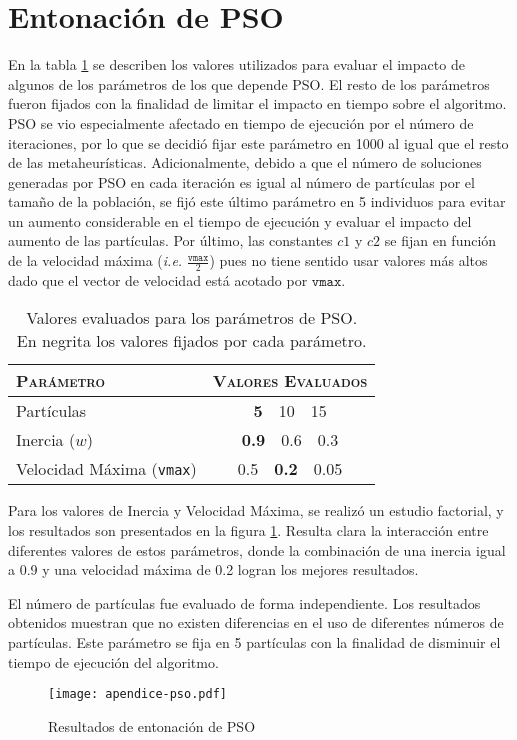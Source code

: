 \section{Entonación de PSO}

En la tabla \ref{table-ap-pso} se describen los valores utilizados para evaluar el impacto de algunos de los parámetros de los que depende PSO. El resto de los parámetros fueron fijados con la finalidad de limitar el impacto en tiempo sobre el algoritmo. PSO se vio especialmente afectado en tiempo de ejecución por el número de iteraciones, por lo que se decidió fijar este parámetro en 1000 al igual que el resto de las metaheurísticas. Adicionalmente, debido a que el número de soluciones generadas por PSO en cada iteración es igual al número de partículas por el tamaño de la población, se fijó este último parámetro en 5 individuos para evitar un aumento considerable en el tiempo de ejecución y evaluar el impacto del aumento de las partículas. Por último, las constantes $c1$ y $c2$ se fijan en función de la velocidad máxima (\emph{i.e.} $\frac{\texttt{vmax}}{2}$) pues no tiene sentido usar valores más altos dado que el vector de velocidad está acotado por $\texttt{vmax}$.

\begin{table}[h!]
\centering
\begin{tabular}{l c}
\hline
\textsc{Parámetro} & \textsc{Valores Evaluados} \\
\hline
\hline
Partículas  & \textbf{5}\ \ 10\ \ 15 \\
Inercia ($w$) & \textbf{0.9}\ \ 0.6\ \ 0.3 \\
Velocidad Máxima (\texttt{vmax}) & 0.5\ \ \textbf{0.2}\ \ 0.05 \\
\hline
\end{tabular}
\caption[Valores evaluados para los parámetros de PSO]{Valores evaluados para los parámetros de PSO.\\En negrita los valores fijados por cada parámetro.}
\label{table-ap-pso}
\end{table}

Para los valores de Inercia y Velocidad Máxima, se realizó un estudio factorial, y los resultados son presentados en la figura \ref{fig-ap-pso}. Resulta clara la interacción entre diferentes valores de estos parámetros, donde la combinación de una inercia igual a 0.9 y una velocidad máxima de 0.2 logran los mejores resultados.

El número de partículas fue evaluado de forma independiente. Los resultados obtenidos muestran que no existen diferencias en el uso de diferentes números de partículas. Este parámetro se fija en 5 partículas con la finalidad de disminuir el tiempo de ejecución del algoritmo.

\begin{figure}[h!]
\centering
\texttt{[image: apendice-pso.pdf]}
\caption{Resultados de entonación de PSO}
\label{fig-ap-pso}
\end{figure}
